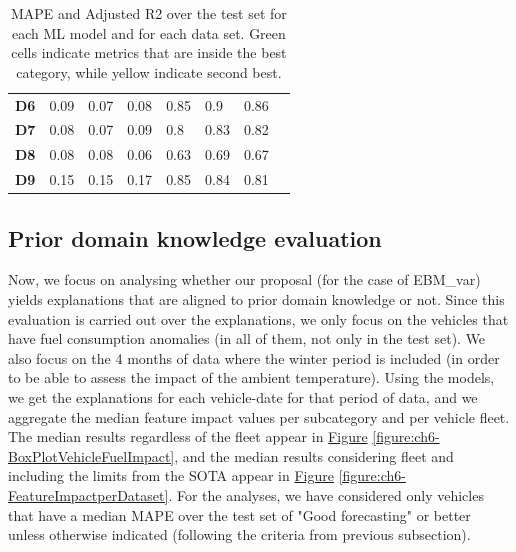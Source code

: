 \begin{table}[h!]
{\begin{tabular}{@{}llllllll@{}}
\textbf{D6} 
& \cellcolor{green!25}0.09 
& \cellcolor{green!25}0.07 
& \cellcolor{green!25}0.08 
& \cellcolor{green!25}0.85 
& \cellcolor{green!25}0.9  
& \cellcolor{green!25}0.86 \\
\textbf{D7} 
& \cellcolor{green!25}0.08 
& \cellcolor{green!25}0.07 
& \cellcolor{green!25}0.09 
& \cellcolor{green!25}0.8  
& \cellcolor{green!25}0.83 
& \cellcolor{green!25}0.82 \\
\textbf{D8} 
& \cellcolor{green!25}0.08 
& \cellcolor{green!25}0.08 
& \cellcolor{green!25}0.06 
& \cellcolor{yellow!25}0.63 
& \cellcolor{green!25}0.69 
& \cellcolor{green!25}0.67 \\
\textbf{D9} 
& \cellcolor{yellow!25}0.15
& \cellcolor{yellow!25}0.15 
& \cellcolor{yellow!25}0.17 
& \cellcolor{green!25}0.85 
& \cellcolor{green!25}0.84 
& \cellcolor{green!25}0.81 \\ \bottomrule
\end{tabular}%
}
\caption{MAPE and Adjusted R2 over the test set for each ML model and for each data set. Green cells indicate metrics that are inside the best category, while yellow indicate second best.}
\label{table:ch6-mape-r2-test}
\end{table}

\subsection{Prior domain knowledge evaluation}\label{subsec:ch6-eval-xai-apriori}
Now, we focus on analysing whether our proposal (for the case of EBM\_var) yields explanations that are aligned to prior domain knowledge or not. Since this evaluation is carried out over the explanations, we only focus on the vehicles that have fuel consumption anomalies (in all of them, not only in the test set). We also focus on the 4 months of data where the winter period is included (in order to be able to assess the impact of the ambient temperature). Using the models, we get the explanations for each vehicle-date for that period of data, and we aggregate the median feature impact values per subcategory and per vehicle fleet. The median results regardless of the fleet appear in \hyperref[figure:ch6-BoxPlotVehicleFuelImpact]{Figure} \ref{figure:ch6-BoxPlotVehicleFuelImpact}, and the median results considering fleet and including the limits from the SOTA appear in \hyperref[figure:ch6-FeatureImpactperDataset]{Figure} \ref{figure:ch6-FeatureImpactperDataset}. For the analyses, we have considered only vehicles that have a median MAPE over the test set of "Good forecasting" or better unless otherwise indicated (following the criteria from previous subsection).

